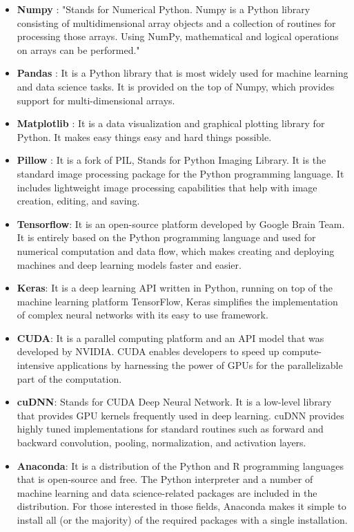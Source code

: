 \begin{itemize}
        \item \textbf{Numpy} : "Stands for Numerical Python. Numpy is a Python library consisting of multidimensional array objects and a collection of routines for processing those arrays. Using NumPy, mathematical and logical operations on arrays can be performed." ~\cite{16}
        \item \textbf{Pandas} : It is a Python library that is most widely used for machine learning and data science tasks. It is provided on the top of  Numpy, which provides support for multi-dimensional arrays. ~\cite{17}
        \item \textbf{Matplotlib} : It is a data visualization and graphical plotting library for Python. It makes easy things easy and hard things possible. ~\cite{18}
        \item \textbf{Pillow} : It is a fork of PIL, Stands for Python Imaging Library. It is the standard image processing package for the Python programming language. It includes lightweight image processing capabilities that help with image creation, editing, and saving. ~\cite{19}  
        \item \textbf{Tensorflow}: It is an open-source platform developed by Google Brain Team. It is entirely based on the Python programming language and used for numerical computation and data flow, which makes creating and deploying machines and deep learning models faster and easier. ~\cite{20}
        \item \textbf{Keras}: It is a deep learning API written in Python, running on top of the machine learning platform TensorFlow, Keras simplifies the implementation of complex neural networks with its easy to use framework. ~\cite{21}
        \item \textbf{CUDA}: It is a parallel computing platform and an API model that was developed by NVIDIA. CUDA enables developers to speed up compute-intensive applications by harnessing the power of GPUs for the parallelizable part of the computation. ~\cite{22}  
        \item \textbf{cuDNN}: Stands for CUDA Deep Neural Network. It is a low-level library that provides GPU kernels frequently used in deep learning. cuDNN  provides highly tuned implementations for standard routines such as forward and backward convolution, pooling, normalization, and activation layers. ~\cite{23}
        \item \textbf{Anaconda}: It is a distribution of the Python and R programming languages that is open-source and free. The Python interpreter and a number of machine learning and data science-related packages are included in the distribution. For those interested in those fields, Anaconda makes it simple to install all (or the majority) of the required packages with a single installation. ~\cite{24}

\end{itemize}
